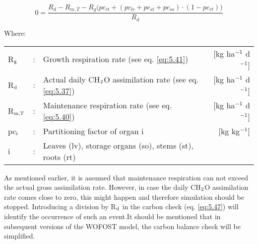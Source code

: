 \begin{equation}
\label{eq:5.47}
0 = {\frac{R_{d} - R_{m,T} - R_{g} \big( pc_{rt} + (pc_{lv} + pc_{st} + pc_{so}) \cdot (1 - pc_{rt}) \big) }{R_d}}  
\end{equation}

Where:\\[5pt]
\begin{tabularx}{\textwidth}{llXr}
	R$_{{\rm g}}$ &:& Growth respiration rate (see eq. \ref{eq:5.41})   &
	[kg ha$^{{\rm -1}}$ d$^{{\rm -1}}$]\\
	R$_{{\rm d}}$ &:& Actual daily CH$_{{\rm 2}}$O assimilation rate (see eq. \ref{eq:5.37})   &
	[kg ha$^{{\rm -1}}$ d$^{{\rm -1}}$]\\
	R$_{{\rm m,T}}$ &:& Maintenance respiration rate (see eq. \ref{eq:5.40})   &
	[kg ha$^{{\rm -1}}$ d$^{{\rm -1}}$]\\
	pc$_{{\rm i}}$ &:& Partitioning factor of organ i    &
	[kg kg$^{{\rm -1}}$]\\
	i &:& Leaves (lv), storage organs (so), stems (st), roots (rt)\\
\end{tabularx}

As mentioned earlier, it is assumed that maintenance respiration can not exceed the actual
gross assimilation rate. However, in case the daily CH$_{{\rm 2}}$O assimilation rate comes close to
zero, this might happen and therefore simulation should be stopped. Introducing a
division by R$_{{\rm d}}$ in the carbon check (eq. \ref{eq:5.47}) will identify the occurrence of such an
event.It should be mentioned that in subsequent versions of the WOFOST model, the carbon
balance check will be simplified.

%
%

